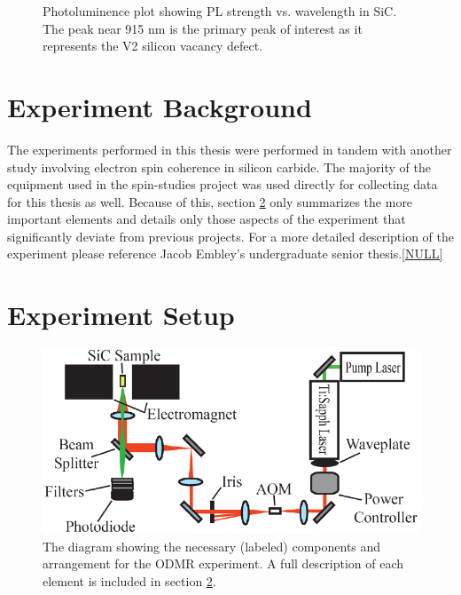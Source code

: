 \documentclass[oneside, astronomy, noacknowlegments]{BYUPhys}
\begin{document}
\begin{figure}
    \caption[Photoluminence Spectra of Silicon Carbide]{\label{fig:SiCPL}
      Photoluminence plot showing PL strength vs. wavelength in SiC. The peak near 915 nm is the primary peak of interest as it represents the V2 silicon vacancy defect.}
 \end{figure}

\section{Experiment Background}

The experiments performed in this thesis were performed in tandem with another study involving electron spin coherence in silicon carbide. The majority of the equipment used in the spin-studies project was used directly for collecting data for this thesis as well. Because of this, section \ref{sec:Experiment} only summarizes the more important elements and details only those aspects of the experiment that significantly deviate from previous projects. For a more detailed description of the experiment please reference Jacob Embley's undergraduate senior thesis.\ref{NULL}

\section{Experiment Setup}
\label{sec:Experiment}

\begin{figure}
    \centerline{\includegraphics{setup_fig}}
    \caption[Diagram of Experimental Setup for ODMR]{\label{fig:setup}
     The diagram showing the necessary (labeled) components and arrangement for the ODMR experiment. A full description of each element is included in section \ref{sec:Experiment}.}
 \end{figure}
\end{document}
